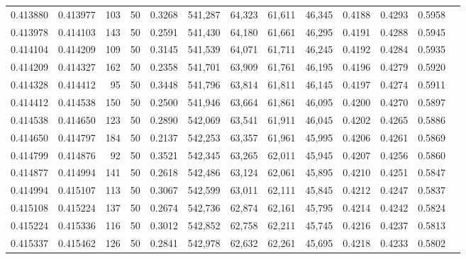 \begin{tabular}{rrrrrrrrrrrrr}
0.413880 & 0.413977 &   103 &  50 &                                     0.3268 & 541,287 &  64,323 &  61,611 &  46,345 & 0.4188 & 0.4293 & 0.5958 \\
0.413978 & 0.414103 &   143 &  50 &                                     0.2591 & 541,430 &  64,180 &  61,661 &  46,295 & 0.4191 & 0.4288 & 0.5945 \\
0.414104 & 0.414209 &   109 &  50 &                                     0.3145 & 541,539 &  64,071 &  61,711 &  46,245 & 0.4192 & 0.4284 & 0.5935 \\
0.414209 & 0.414327 &   162 &  50 &                                     0.2358 & 541,701 &  63,909 &  61,761 &  46,195 & 0.4196 & 0.4279 & 0.5920 \\
0.414328 & 0.414412 &    95 &  50 &                                     0.3448 & 541,796 &  63,814 &  61,811 &  46,145 & 0.4197 & 0.4274 & 0.5911 \\
0.414412 & 0.414538 &   150 &  50 &                                     0.2500 & 541,946 &  63,664 &  61,861 &  46,095 & 0.4200 & 0.4270 & 0.5897 \\
0.414538 & 0.414650 &   123 &  50 &                                     0.2890 & 542,069 &  63,541 &  61,911 &  46,045 & 0.4202 & 0.4265 & 0.5886 \\
0.414650 & 0.414797 &   184 &  50 &                                     0.2137 & 542,253 &  63,357 &  61,961 &  45,995 & 0.4206 & 0.4261 & 0.5869 \\
0.414799 & 0.414876 &    92 &  50 &                                     0.3521 & 542,345 &  63,265 &  62,011 &  45,945 & 0.4207 & 0.4256 & 0.5860 \\
0.414877 & 0.414994 &   141 &  50 &                                     0.2618 & 542,486 &  63,124 &  62,061 &  45,895 & 0.4210 & 0.4251 & 0.5847 \\
0.414994 & 0.415107 &   113 &  50 &                                     0.3067 & 542,599 &  63,011 &  62,111 &  45,845 & 0.4212 & 0.4247 & 0.5837 \\
0.415108 & 0.415224 &   137 &  50 &                                     0.2674 & 542,736 &  62,874 &  62,161 &  45,795 & 0.4214 & 0.4242 & 0.5824 \\
0.415224 & 0.415336 &   116 &  50 &                                     0.3012 & 542,852 &  62,758 &  62,211 &  45,745 & 0.4216 & 0.4237 & 0.5813 \\
0.415337 & 0.415462 &   126 &  50 &                                     0.2841 & 542,978 &  62,632 &  62,261 &  45,695 & 0.4218 & 0.4233 & 0.5802 \\

\end{tabular}
